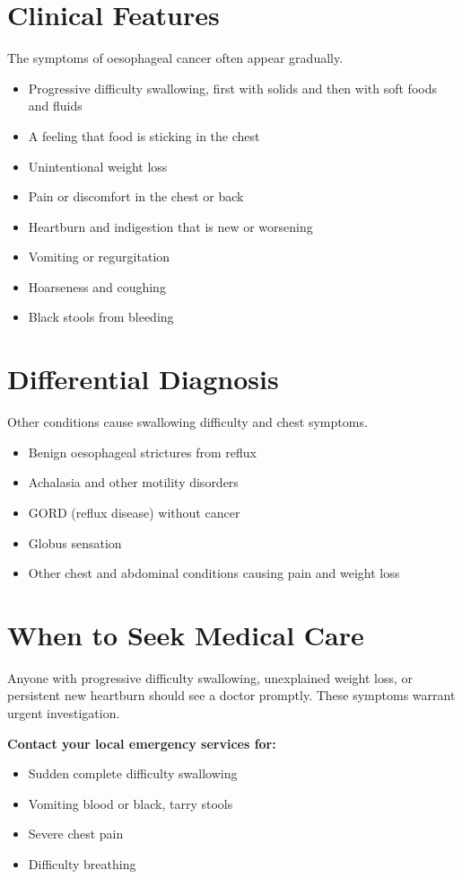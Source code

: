 \section*{Clinical Features}
The symptoms of oesophageal cancer often appear gradually.
\begin{itemize}
    \item Progressive difficulty swallowing, first with solids and then with soft foods and fluids
    \item A feeling that food is sticking in the chest
    \item Unintentional weight loss
    \item Pain or discomfort in the chest or back
    \item Heartburn and indigestion that is new or worsening
    \item Vomiting or regurgitation
    \item Hoarseness and coughing
    \item Black stools from bleeding
\end{itemize}

\section*{Differential Diagnosis}
Other conditions cause swallowing difficulty and chest symptoms.
\begin{itemize}
    \item Benign oesophageal strictures from reflux
    \item Achalasia and other motility disorders
    \item GORD (reflux disease) without cancer
    \item Globus sensation
    \item Other chest and abdominal conditions causing pain and weight loss
\end{itemize}

\section*{When to Seek Medical Care}
Anyone with progressive difficulty swallowing, unexplained weight loss, or persistent new heartburn should see a doctor promptly. These symptoms warrant urgent investigation.

\textbf{Contact your local emergency services for:}
\begin{itemize}
    \item Sudden complete difficulty swallowing
    \item Vomiting blood or black, tarry stools
    \item Severe chest pain
    \item Difficulty breathing
\end{itemize}


